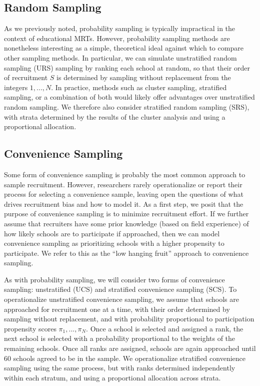 \documentclass[english,man,floatsintext]{apa6}
\begin{document}
\hypertarget{random-sampling}{%
\subsection{Random Sampling}\label{random-sampling}}

As we previously noted, probability sampling is typically impractical in the context of educational MRTs. However, probability sampling methods are nonetheless interesting as a simple, theoretical ideal against which to compare other sampling methods. In particular, we can simulate unstratified random sampling (URS) sampling by ranking each school at random, so that their order of recruitment \(S\) is determined by sampling without replacement from the integers \(1,...,N\). In practice, methods such as cluster sampling, stratified sampling, or a combination of both would likely offer advantages over unstratified random sampling. We therefore also consider stratified random sampling (SRS), with strata determined by the results of the cluster analysis and using a proportional allocation.

\hypertarget{convenience-sampling}{%
\subsection{Convenience Sampling}\label{convenience-sampling}}

Some form of convenience sampling is probably the most common approach to sample recruitment.
However, researchers rarely operationalize or report their process for selecting a convenience sample, leaving open the questions of what drives recruitment bias and how to model it. As a first step, we posit that the purpose of convenience sampling is to minimize recruitment effort. If we further assume that recruiters have some prior knowledge (based on field experience) of how likely schools are to participate if approached, then we can model convenience sampling as prioritizing schools with a higher propensity to participate. We refer to this as the \enquote{low hanging fruit} approach to convenience sampling.

As with probability sampling, we will consider two forms of convenience sampling: unstratified (UCS) and stratified convenience sampling (SCS). To operationalize unstratified convenience sampling, we assume that schools are approached for recruitment one at a time, with their order determined by sampling without replacement, and with probability proportional to participation propensity scores \(\pi_1,...,\pi_N\).
Once a school is selected and assigned a rank, the next school is selected with a probability proportional to the weights of the remaining schools. Once all ranks are assigned, schools are again approached until 60 schools agreed to be in the sample. We operationalize stratified convenience sampling using the same process, but with ranks determined independently within each stratum, and using a proportional allocation across strata.
\end{document}
